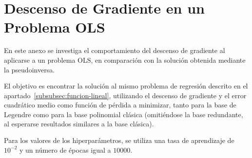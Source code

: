 
\chapter{Descenso de Gradiente en un Problema OLS}\label{ap:apendiceC}

En este anexo se investiga el comportamiento del descenso de gradiente al aplicarse a un problema OLS, en comparación con la solución obtenida mediante la pseudoinversa.

El objetivo es encontrar la solución al mismo problema de regresión descrito en el apartado~\ref{subsubsec:funcion-lineal}, utilizando el descenso de gradiente y el error cuadrático medio como función de pérdida a minimizar, tanto para la base de Legendre como para la base polinomial clásica (omitiéndose la base redundante, al esperarse resultados similares a la base clásica). 

Para los valores de los hiperparámetros, se utiliza una tasa de aprendizaje de $10^{-2}$ y un número de épocas igual a $10000$.

